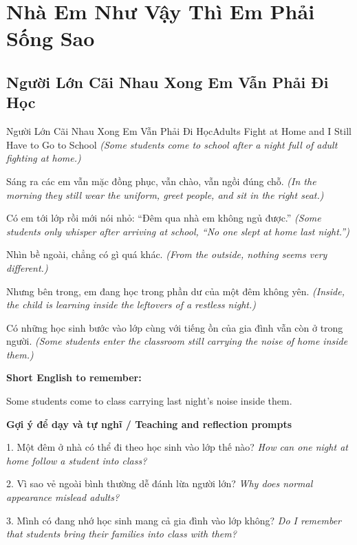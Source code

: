 \chapter{Nhà Em Như Vậy Thì Em Phải Sống Sao}

\section{Người Lớn Cãi Nhau Xong Em Vẫn Phải Đi Học}
\begin{truyen}{Người Lớn Cãi Nhau Xong Em Vẫn Phải Đi Học}{Adults Fight at Home and I Still Have to Go to School}
\textit{(Some students come to school after a night full of adult fighting at home.)}

Sáng ra các em vẫn mặc đồng phục, vẫn chào, vẫn ngồi đúng chỗ.
\textit{(In the morning they still wear the uniform, greet people, and sit in the right seat.)}

Có em tới lớp rồi mới nói nhỏ: “Đêm qua nhà em không ngủ được.”
\textit{(Some students only whisper after arriving at school, “No one slept at home last night.”)}

Nhìn bề ngoài, chẳng có gì quá khác.
\textit{(From the outside, nothing seems very different.)}

Nhưng bên trong, em đang học trong phần dư của một đêm không yên.
\textit{(Inside, the child is learning inside the leftovers of a restless night.)}

\end{truyen}

\begin{baihoc}
Có những học sinh bước vào lớp cùng với tiếng ồn của gia đình vẫn còn ở trong người.
\textit{(Some students enter the classroom still carrying the noise of home inside them.)}
\end{baihoc}

\begin{ghinhoanh}
\textbf{Short English to remember:}

Some students come to class carrying last night's noise inside them.

\end{ghinhoanh}

\begin{tuhocnhanh}
\textbf{Gợi ý để dạy và tự nghĩ / Teaching and reflection prompts}

1. Một đêm ở nhà có thể đi theo học sinh vào lớp thế nào? \textit{How can one night at home follow a student into class?}

2. Vì sao vẻ ngoài bình thường dễ đánh lừa người lớn? \textit{Why does normal appearance mislead adults?}

3. Mình có đang nhớ học sinh mang cả gia đình vào lớp không? \textit{Do I remember that students bring their families into class with them?}
\end{tuhocnhanh}
\ngancach

